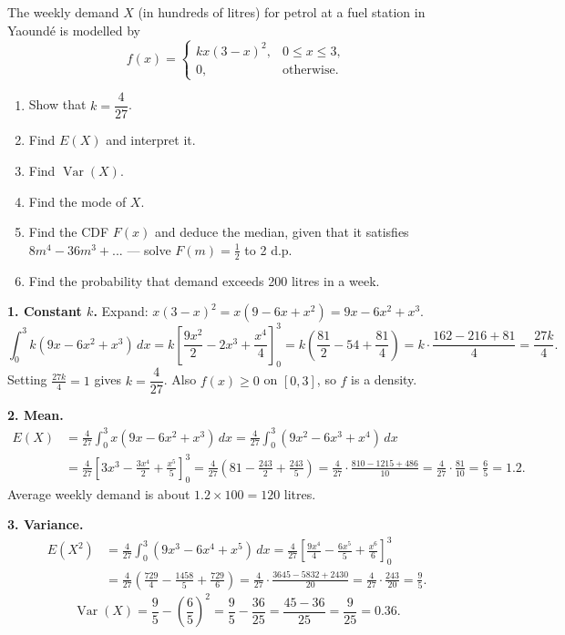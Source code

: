 \documentclass[11pt]{article}
\begin{document}
\begin{exoresolu}
The weekly demand $X$ (in hundreds of litres) for petrol at a fuel station in Yaoundé is modelled by
\[
f(x)=\begin{cases} kx(3-x)^2, & 0\leq x\leq 3,\\ 0, & \text{otherwise.}\end{cases}
\]
\begin{enumerate}
\item Show that $k=\dfrac{4}{27}$.
\item Find $E(X)$ and interpret it.
\item Find $\operatorname{Var}(X)$.
\item Find the mode of $X$.
\item Find the CDF $F(x)$ and deduce the median, given that it satisfies $8m^4-36m^3+... $ — solve $F(m)=\tfrac12$ to 2 d.p.
\item Find the probability that demand exceeds 200 litres in a week.
\end{enumerate}
\tcblower
\textbf{1. Constant $k$.} Expand: $x(3-x)^2=x(9-6x+x^2)=9x-6x^2+x^3$.
\[
\int_0^3 k(9x-6x^2+x^3)\,dx=k\left[\frac{9x^2}{2}-2x^3+\frac{x^4}{4}\right]_0^3=k\left(\frac{81}{2}-54+\frac{81}{4}\right)=k\cdot\frac{162-216+81}{4}=\frac{27k}{4}.
\]
Setting $\frac{27k}{4}=1$ gives $k=\dfrac{4}{27}$. Also $f(x)\geq0$ on $[0,3]$, so $f$ is a density.

\textbf{2. Mean.}
\begin{align*}
E(X)&=\frac{4}{27}\int_0^3 x(9x-6x^2+x^3)\,dx=\frac{4}{27}\int_0^3(9x^2-6x^3+x^4)\,dx\\
&=\frac{4}{27}\left[3x^3-\frac{3x^4}{2}+\frac{x^5}{5}\right]_0^3=\frac{4}{27}\left(81-\frac{243}{2}+\frac{243}{5}\right)=\frac{4}{27}\cdot\frac{810-1215+486}{10}=\frac{4}{27}\cdot\frac{81}{10}=\frac{6}{5}=1.2.
\end{align*}
Average weekly demand is about $1.2\times100=120$ litres.

\textbf{3. Variance.}
\begin{align*}
E(X^2)&=\frac{4}{27}\int_0^3(9x^3-6x^4+x^5)\,dx=\frac{4}{27}\left[\frac{9x^4}{4}-\frac{6x^5}{5}+\frac{x^6}{6}\right]_0^3\\
&=\frac{4}{27}\left(\frac{729}{4}-\frac{1458}{5}+\frac{729}{6}\right)=\frac{4}{27}\cdot\frac{3645-5832+2430}{20}=\frac{4}{27}\cdot\frac{243}{20}=\frac{9}{5}.
\end{align*}
\[
\operatorname{Var}(X)=\frac95-\left(\frac65\right)^2=\frac95-\frac{36}{25}=\frac{45-36}{25}=\frac{9}{25}=0.36.
\]


\end{exoresolu}
\end{document}
